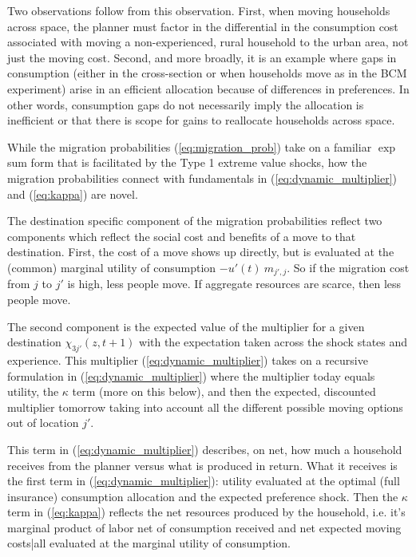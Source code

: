 \documentclass[12pt,pdftex]{article}
\begin{document}
\begin{onehalfspacing}
Two observations follow from this observation. First, when moving households across space, the planner must factor in the differential in the consumption cost associated with moving a non-experienced, rural household to the urban area, not just the moving cost. Second, and more broadly, it is an example where gaps in consumption (either in the cross-section or when households move as in the BCM experiment) arise in an efficient allocation because of differences in preferences. In other words, consumption gaps do not necessarily imply the allocation is inefficient or that there is scope for gains to reallocate households across space.

While the migration probabilities (\ref{eq:migration_prob}) take on a familiar $\exp$ sum form that is facilitated by the Type 1 extreme value shocks, how the migration probabilities connect with fundamentals in (\ref{eq:dynamic_multiplier}) and (\ref{eq:kappa}) are novel.

The destination specific component of the migration probabilities reflect two components which reflect the social cost and benefits of a move to that destination. First, the cost of a move shows up directly, but is evaluated at the (common) marginal utility of consumption $-u'(t) \ m_{j',j}$. So if the migration cost from $j$ to $j'$ is high, less people move. If aggregate resources are scarce, then less people move.

The second component is the expected value of the multiplier for a given destination $\chi_{3j'}(z, t+1)$ with the expectation taken across the shock states and experience. This multiplier (\ref{eq:dynamic_multiplier}) takes on a recursive formulation in (\ref{eq:dynamic_multiplier}) where the multiplier today equals utility, the $\kappa$ term (more on this below), and then the expected, discounted multiplier tomorrow taking into account all the different possible moving options out of location $j'$.

This term in (\ref{eq:dynamic_multiplier}) describes, on net, how much a household receives from the planner versus what is produced in return. What it receives is the first term in (\ref{eq:dynamic_multiplier}): utility evaluated at the optimal (full insurance) consumption allocation and the expected preference shock. Then the $\kappa$ term in (\ref{eq:kappa}) reflects the net resources produced by the household, i.e. it's marginal product of labor net of consumption received and net expected moving costs|all evaluated at the marginal utility of consumption.


\end{onehalfspacing}
\end{document}
